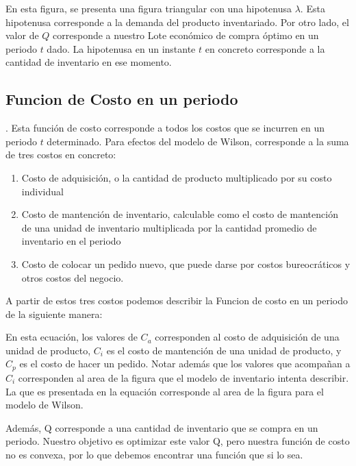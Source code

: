 En esta figura, se presenta una figura triangular con una hipotenusa $\lambda$. Esta hipotenusa corresponde a la demanda del producto inventariado. Por otro lado, el valor de $Q$ corresponde a nuestro Lote económico de compra óptimo en un periodo $t$ dado. La hipotenusa en un instante $t$ en concreto corresponde a la cantidad de inventario en ese momento.

\subsection{Funcion de Costo en un periodo}.
Esta función de costo corresponde a todos los costos que se incurren en un periodo $t$ determinado. Para efectos del modelo de Wilson, corresponde a la suma de tres costos en concreto:

\begin{enumerate}
    \item Costo de adquisición, o la cantidad de producto multiplicado por su costo individual
    \item Costo de mantención de inventario, calculable como el costo de mantención de una unidad de inventario multiplicada por la cantidad promedio de inventario en el periodo
    \item Costo de colocar un pedido nuevo, que puede darse por costos bureocráticos y otros costos del negocio.
\end{enumerate}

A partir de estos tres costos podemos describir la Funcion de costo en un periodo de la siguiente manera:


En esta ecuación, los valores de $C_a$ corresponden al costo de adquisición de una unidad de producto, $C_i$ es el costo de mantención de una unidad de producto, y $C_p$ es el costo de hacer un pedido. Notar además que los valores que acompañan a $C_i$ corresponden al area de la figura que el modelo de inventario intenta describir. La que es presentada en la equación  corresponde al area de la figura para el modelo de Wilson.

Además, Q corresponde a una cantidad de inventario que se compra en un periodo. Nuestro objetivo es optimizar este valor Q, pero nuestra función de costo no es convexa, por lo que debemos encontrar una función que si lo sea.

